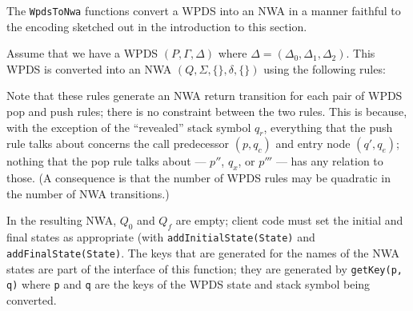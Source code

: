 The \texttt{WpdsToNwa} functions convert a WPDS into an NWA in a manner
faithful to the encoding sketched out in the introduction to this section.

Assume that we have a WPDS $(P, \Gamma, \Delta )$ 
where $\Delta = (\Delta_0, \Delta_1, \Delta_2)$. This 
WPDS is converted into an NWA $(Q,\Sigma,\{\},\delta,\{\})$ using the following rules:


Note that these rules generate an NWA return transition for each pair of WPDS pop
and push rules; there is no constraint between the two rules.  This is
because, with the exception of the ``revealed'' stack symbol $q_r$,
everything that the push rule talks about concerns the call predecessor
$(p,q_c)$ and entry node $(q', q_e)$; nothing that the pop rule talks about ---
$p''$, $q_x$, or $p'''$ --- has any relation to those. (A consequence is that the
number of WPDS rules may be quadratic in the number of NWA transitions.)


In the resulting NWA, $Q_0$ and $Q_f$ are empty; client code must set the initial and
final states as appropriate (with \texttt{addInitialState(State)} and
\texttt{addFinalState(State)}. The keys that are generated for the names of the
NWA states are part of the interface of this function; they are generated by
\texttt{getKey(p, q)} where \texttt{p} and \texttt{q} are the keys of the
WPDS state and stack symbol being converted.

